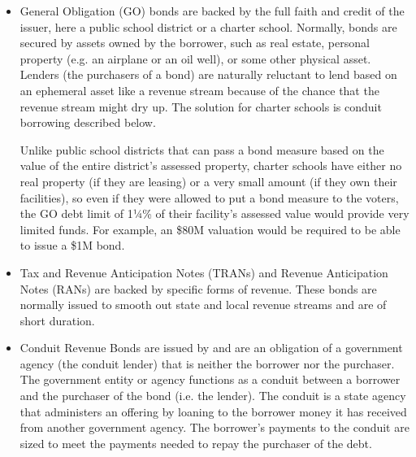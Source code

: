 \begin{itemize}
  \item General Obligation (GO) bonds are backed by the full faith and credit of the issuer, here a public school district or a charter school. Normally, bonds are secured by assets owned by the borrower, such as real estate, personal property (e.g. an airplane or an oil well), or some other physical asset. Lenders (the purchasers of a bond) are naturally reluctant to lend based on an ephemeral asset like a revenue stream because of the chance that the revenue stream might dry up. The solution for charter schools is conduit borrowing described below.

  Unlike public school districts that can pass a bond measure based on the value of the entire district's assessed property, charter schools have either no real property (if they are leasing) or a very small amount (if they own their facilities), so even if they were allowed to put a bond measure to the voters, the GO debt limit of 1¼\% of their facility's assessed value would provide very limited funds. For example, an \$80M valuation would be required to be able to issue a \$1M bond. 

  \item Tax and Revenue Anticipation Notes (TRANs) and Revenue Anticipation Notes (RANs) are backed by specific forms of revenue. These bonds are normally issued to smooth out state and local revenue streams and are of short duration.
  
  \item Conduit Revenue Bonds are issued by and are an obligation of a government agency (the conduit lender) that is neither the borrower nor the purchaser. The government entity or agency functions as a conduit between a borrower and the purchaser of the bond (i.e. the lender). The conduit is a state agency that administers an offering by loaning to the borrower money it has received from another government agency. The borrower's payments to the conduit are sized to meet the payments needed to repay the purchaser of the debt.

\begin{comment}
  For example, in 2014, the California Municipal Finance Authority issued bonds (2014A:tax-exempt and 2014B:taxable) for \$32,915,000. These bonds were bought by Approved Institutional Buyers, and the proceeds were loaned to Launchpad Development Company which used them for public benefit. The borrower is Launchpad Development Company, and the conduit borrower is the California Municipal Finance Authority.
\end{comment}
\end{itemize}

